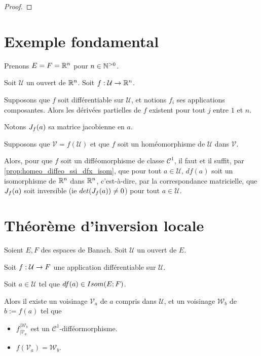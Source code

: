 \ifdefined\outputproof
\begin{proof}

\end{proof}
\fi

\section{Exemple fondamental}

Prenons $E = F = \mathbb{R}^{n}$ pour $n \in \mathbb{N}^{> 0}$.

Soit $\mathcal{U}$ un ouvert de $\mathbb{R}^{n}$.
Soit $f : \mathcal{U} \rightarrow \mathbb{R}^{n}$.

Supposons que $f$ soit différentiable sur $\mathcal{U}$, et notions $f_{i}$ ses
applications composantes. Alors les dérivées partielles de $f$ existent pour
tout $j$ entre $1$ et $n$.

Notons $J_{f}(a)$ sa matrice jacobienne en $a$.

Supposons que $\mathcal{V} = f(\mathcal{U})$ et que $f$ soit un homéomorphisme
de $\mathcal{U}$ dans $\mathcal{V}$.

Alors, pour que $f$ soit un difféomorphisme de classe $\mathcal{C}^{1}$, il faut
et il suffit, par \ref{prop:homeo_diffeo_ssi_dfx_isom}, que pour tout $a \in
\mathcal{U}$, $df(a)$ soit un isomorphisme de $\mathbb{R}^{n}$ dans $\mathbb{R}^{n}$,
c'est-à-dire, par la correspondance matricielle, que $J_{f}(a)$
soit inversible (ie $det(J_{f}(a)) \neq 0$) pour tout $a \in
\mathcal{U}$.

\section{Théorème d'inversion locale}

\begin{theorem} 
	\label{theorem:local_inversion}
	Soient $E, F$ des espaces de Banach.
	Soit $\mathcal{U}$ un ouvert de $E$.

	Soit $f : \mathcal{U} \rightarrow F$ une application différentiable sur
	$\mathcal{U}$.

	Soit $a \in \mathcal{U}$ tel que $df(a) \in Isom(E; F)$.

	Alors il existe un voisinage $\mathcal{V}_{a}$ de $a$ compris dans
	$\mathcal{U}$, et un voisinage $\mathcal{W}_{b}$ de $b := f(a)$ tel que

	\begin{itemize}
		\item $f^{|\mathcal{W}_{b}}_{|\mathcal{V}_{a}}$ est un $\mathcal{C}^{1}$-difféormorphisme.
		\item $f(\mathcal{V}_{a}) = \mathcal{W}_{b}$.
	\end{itemize}
\end{theorem}

